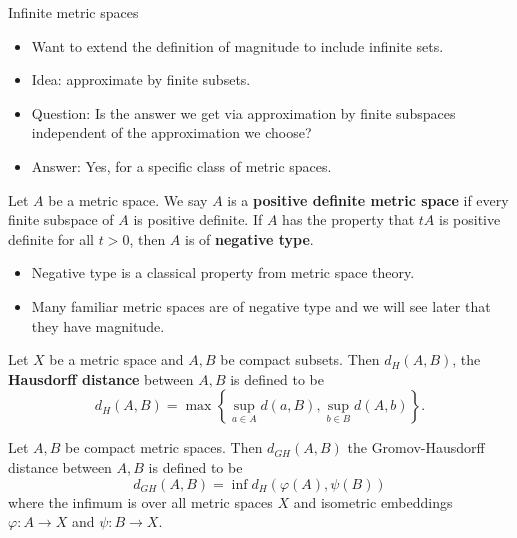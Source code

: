 \documentclass[12pt]{beamer}
\begin{document}
\begin{frame}[allowframebreaks]{Infinite metric spaces}
\begin{itemize}
\item Want to extend the definition of magnitude to include infinite sets.
\item Idea: approximate by finite subsets.
\item Question: Is the answer we get via approximation by finite subspaces independent of the approximation we choose?
\item Answer: Yes, for a specific class of metric spaces.
\end{itemize}

\framebreak

\begin{definition}
Let $A$ be a metric space. We say $A$ is a \textbf{positive definite metric space} if every finite subspace of $A$ is positive definite. If $A$ has the property that $tA$ is positive definite for all $t > 0$, then $A$ is of \textbf{negative type}.
\end{definition}

\begin{itemize}
\item Negative type is a classical property from metric space theory.
\item Many familiar metric spaces are of negative type and we will see later that they have magnitude.
\end{itemize}

\framebreak

\begin{definition}
Let $X$ be a metric space and $A,B$ be compact subsets. Then $d_H(A,B)$, the \textbf{Hausdorff distance} between $A,B$ is defined to be
\begin{equation*}
d_H(A,B) = \max\left\{\sup\limits_{a \in A} d(a,B), \sup\limits_{b \in B} d(A,b)\right\}.
\end{equation*}
\end{definition}

\framebreak

\begin{definition}
Let $A,B$ be compact metric spaces. Then $d_{GH}(A,B)$ the Gromov-Hausdorff distance between $A,B$ is defined to be
\begin{equation*}
d_{GH}(A,B) = \inf d_H(\varphi(A),\psi(B))
\end{equation*}
where the infimum is over all metric spaces $X$ and isometric embeddings $\varphi: A \to X$ and $\psi: B \to X$.
\end{definition}


\end{frame}
\end{document}
